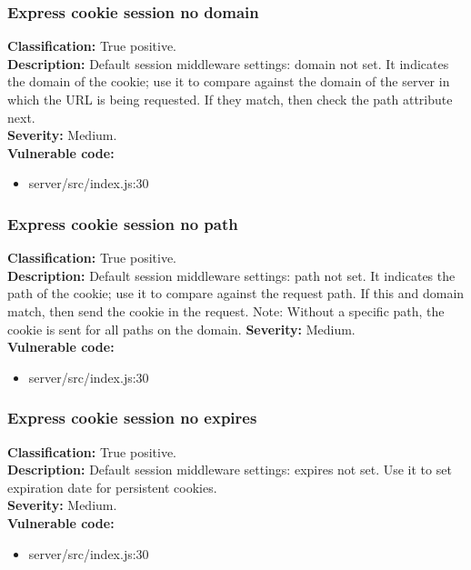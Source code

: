 \documentclass[]{article}
\begin{document}
\subsubsection{Express cookie session no domain}
\textbf{Classification:} True positive. \\ 
\textbf{Description:} Default session middleware settings: domain not set. It indicates the domain of 
the cookie; use it to compare against the domain of the server in which the URL is being requested. 
If they match, then check the path attribute next. \\ 
\textbf{Severity:} Medium. \\ 
\textbf{Vulnerable code:} 
\begin{itemize}
    \item server/src/index.js:30
\end{itemize}

\subsubsection{Express cookie session no path}
\textbf{Classification:} True positive. \\ 
\textbf{Description:} Default session middleware settings: path not set. It indicates the path of the cookie; use it to compare against the request path. If this and domain match, then send the cookie in the request. 
Note: Without a specific path, the cookie is sent for all paths on the domain.
\textbf{Severity:} Medium. \\ 
\textbf{Vulnerable code:} 
\begin{itemize}
    \item server/src/index.js:30
\end{itemize}

\subsubsection{Express cookie session no expires}
\textbf{Classification:} True positive. \\ 
\textbf{Description:}  Default session middleware settings: expires not set. Use it to set expiration date for persistent cookies. \\ 
\textbf{Severity:} Medium. \\ 
\textbf{Vulnerable code:} 
\begin{itemize}
    \item server/src/index.js:30
\end{itemize}
\end{document}
